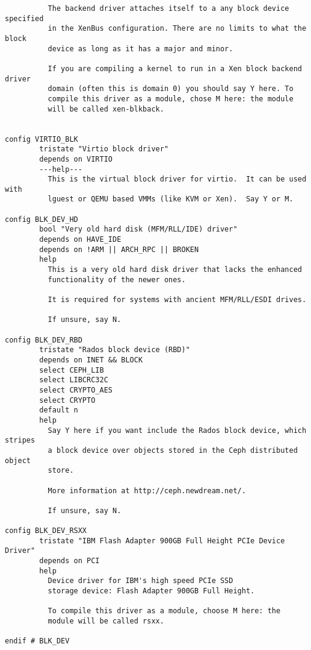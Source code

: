 \documentclass[journal,10pt,onecolumn,compsoc,letterpaper,draftclsnofoot,table,xcdraw]{IEEEtran} \usepackage[margin=0.75in]{geometry}
\begin{document}
\begin{verbatim}
          The backend driver attaches itself to a any block device specified
          in the XenBus configuration. There are no limits to what the block
          device as long as it has a major and minor.

          If you are compiling a kernel to run in a Xen block backend driver
          domain (often this is domain 0) you should say Y here. To
          compile this driver as a module, chose M here: the module
          will be called xen-blkback.


config VIRTIO_BLK
        tristate "Virtio block driver"
        depends on VIRTIO
        ---help---
          This is the virtual block driver for virtio.  It can be used with
          lguest or QEMU based VMMs (like KVM or Xen).  Say Y or M.

config BLK_DEV_HD
        bool "Very old hard disk (MFM/RLL/IDE) driver"
        depends on HAVE_IDE
        depends on !ARM || ARCH_RPC || BROKEN
        help
          This is a very old hard disk driver that lacks the enhanced
          functionality of the newer ones.

          It is required for systems with ancient MFM/RLL/ESDI drives.

          If unsure, say N.

config BLK_DEV_RBD
        tristate "Rados block device (RBD)"
        depends on INET && BLOCK
        select CEPH_LIB
        select LIBCRC32C
        select CRYPTO_AES
        select CRYPTO
        default n
        help
          Say Y here if you want include the Rados block device, which stripes
          a block device over objects stored in the Ceph distributed object
          store.

          More information at http://ceph.newdream.net/.

          If unsure, say N.

config BLK_DEV_RSXX
        tristate "IBM Flash Adapter 900GB Full Height PCIe Device Driver"
        depends on PCI
        help
          Device driver for IBM's high speed PCIe SSD
          storage device: Flash Adapter 900GB Full Height.

          To compile this driver as a module, choose M here: the
          module will be called rsxx.

endif # BLK_DEV
\end{verbatim}
\end{document}
